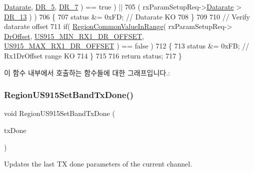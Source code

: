 \begin{DoxyCode}
      \mbox{\hyperlink{structs_rx_param_setup_req_params_ae2f6080f3aa0e9485c55513ca56bb24d}{Datarate}}, \mbox{\hyperlink{group___r_e_g_i_o_n_ga872e12c82020c02a7f70a1c6ed1375df}{DR\_5}}, \mbox{\hyperlink{group___r_e_g_i_o_n_ga3a06805baf4f00911a3a5d3dbadebf61}{DR\_7}} ) == true ) ||
705         ( rxParamSetupReq->\mbox{\hyperlink{structs_rx_param_setup_req_params_ae2f6080f3aa0e9485c55513ca56bb24d}{Datarate}} > \mbox{\hyperlink{group___r_e_g_i_o_n_ga226f47470cc69a6fe831f7c92709bc1f}{DR\_13}} ) )
706     \{
707         status &= 0xFD; \textcolor{comment}{// Datarate KO}
708     \}
709 
710     \textcolor{comment}{// Verify datarate offset}
711     \textcolor{keywordflow}{if}( \mbox{\hyperlink{group___r_e_g_i_o_n_c_o_m_m_o_n_gafdd1c80d953e18d755a631b72a9c3bd3}{RegionCommonValueInRange}}( rxParamSetupReq->
      \mbox{\hyperlink{structs_rx_param_setup_req_params_ad920e18a48423b1eb1fe40d1b2b082d4}{DrOffset}}, \mbox{\hyperlink{group___r_e_g_i_o_n_u_s915_gac1d58ceae4ccf7be5aa7d89fa9cb9321}{US915\_MIN\_RX1\_DR\_OFFSET}}, 
      \mbox{\hyperlink{group___r_e_g_i_o_n_u_s915_gab5445433062754a147e74e8c325aa3b9}{US915\_MAX\_RX1\_DR\_OFFSET}} ) == false )
712     \{
713         status &= 0xFB; \textcolor{comment}{// Rx1DrOffset range KO}
714     \}
715 
716     \textcolor{keywordflow}{return} status;
717 \}
\end{DoxyCode}
이 함수 내부에서 호출하는 함수들에 대한 그래프입니다.\+:
\mbox{\label{group___r_e_g_i_o_n_u_s915_ga821c323447c6cadc64cd2d25725782c0}} 
\subsubsection{\texorpdfstring{Region\+U\+S915\+Set\+Band\+Tx\+Done()}{RegionUS915SetBandTxDone()}}
{\footnotesize\ttfamily void Region\+U\+S915\+Set\+Band\+Tx\+Done (\begin{DoxyParamCaption}\item[{\mbox{\hyperlink{group___r_e_g_i_o_n_gad0524aa0673c0814a71e7a4f9cade3fc}{Set\+Band\+Tx\+Done\+Params\+\_\+t}} $\ast$}]{tx\+Done }\end{DoxyParamCaption})}



Updates the last TX done parameters of the current channel. 


